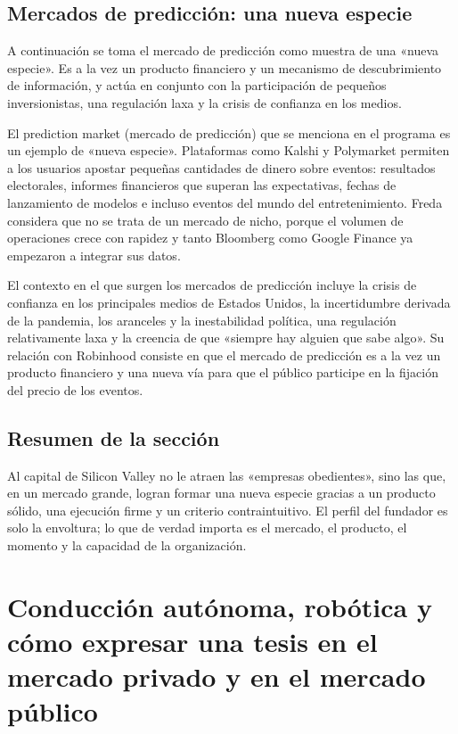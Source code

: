 \documentclass[a4paper]{article}
\begin{document}
\subsection{Mercados de predicción: una nueva especie}

A continuación se toma el mercado de predicción como muestra de una «nueva especie». Es a la vez un producto financiero y un mecanismo de descubrimiento de información, y actúa en conjunto con la participación de pequeños inversionistas, una regulación laxa y la crisis de confianza en los medios.

El prediction market (mercado de predicción) que se menciona en el programa es un ejemplo de «nueva especie». Plataformas como Kalshi y Polymarket permiten a los usuarios apostar pequeñas cantidades de dinero sobre eventos: resultados electorales, informes financieros que superan las expectativas, fechas de lanzamiento de modelos e incluso eventos del mundo del entretenimiento. Freda considera que no se trata de un mercado de nicho, porque el volumen de operaciones crece con rapidez y tanto Bloomberg como Google Finance ya empezaron a integrar sus datos.

El contexto en el que surgen los mercados de predicción incluye la crisis de confianza en los principales medios de Estados Unidos, la incertidumbre derivada de la pandemia, los aranceles y la inestabilidad política, una regulación relativamente laxa y la creencia de que «siempre hay alguien que sabe algo». Su relación con Robinhood consiste en que el mercado de predicción es a la vez un producto financiero y una nueva vía para que el público participe en la fijación del precio de los eventos.

\subsection{Resumen de la sección}

Al capital de Silicon Valley no le atraen las «empresas obedientes», sino las que, en un mercado grande, logran formar una nueva especie gracias a un producto sólido, una ejecución firme y un criterio contraintuitivo. El perfil del fundador es solo la envoltura; lo que de verdad importa es el mercado, el producto, el momento y la capacidad de la organización.
\section{Conducción autónoma, robótica y cómo expresar una tesis en el mercado privado y en el mercado público}
\end{document}
